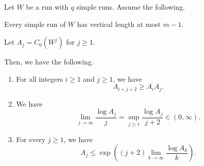 \begin{proposition}\label{prop:periodic}
Let $W$ be a run with $q$ simple runs. Assume the following.
\begin{hypotheses}
\item\label{hyp:periodic-lengths} Every simple run of $W$ has vertical length at most $m-1$.
\item Let $A_j=C_0(W^j)$ for $j\ge1$.
\end{hypotheses}
Then, we have the following.

\begin{enumerate}
\item\label{c:periodic-supermultiplicativity} For all integers $i\ge1$ and $j\ge1$, we have
\[
 A_{i+j+2}\ge A_iA_j.
\]
\item\label{c:periodic-limit} We have
\begin{equation}\label{eq:periodic-limit}
 \lim_{j\to\infty}\frac{\log A_j}{j}
       =\sup_{j\ge1}\frac{\log A_j}{j+2}
       \in(0,\infty).
\end{equation}
\item\label{c:periodic-bound} For every $j\ge1$, we have
\[
 A_j\le\exp\left((j+2)\lim_{k\to\infty}\frac{\log A_k}{k}\right).
\]
\end{enumerate}
\end{proposition}
